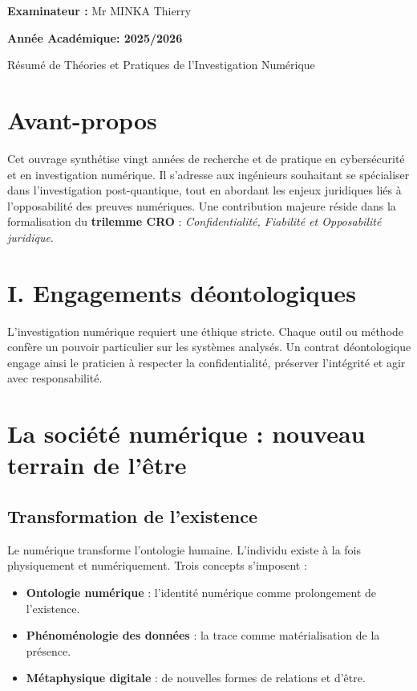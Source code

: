\documentclass[12pt,a4paper]{article}
\begin{document}
\vspace{1.5cm}

\noindent
\textbf{Examinateur :} \quad Mr MINKA Thierry 

\vfill %

\begin{center}
  \Large \textbf{Année Académique: 2025/2026}
\end{center}

\newpage %


\begin{center}
\Huge Résumé de \og Théories et Pratiques de l’Investigation Numérique \fg
\end{center}

\vspace{1cm}

\section*{Avant-propos}
Cet ouvrage synthétise vingt années de recherche et de pratique en cybersécurité et en investigation numérique. 
Il s’adresse aux ingénieurs souhaitant se spécialiser dans l’investigation post-quantique, tout en abordant 
les enjeux juridiques liés à l’opposabilité des preuves numériques. 
Une contribution majeure réside dans la formalisation du \textbf{trilemme CRO} : 
\textit{Confidentialité, Fiabilité et Opposabilité juridique}.

\section*{I. Engagements déontologiques}
L’investigation numérique requiert une éthique stricte. 
Chaque outil ou méthode confère un pouvoir particulier sur les systèmes analysés. 
Un contrat déontologique engage ainsi le praticien à respecter la confidentialité, 
préserver l’intégrité et agir avec responsabilité.

\section{La société numérique : nouveau terrain de l’être}
\subsection{Transformation de l’existence}
Le numérique transforme l’ontologie humaine. L’individu existe à la fois physiquement et 
numériquement. Trois concepts s’imposent :
\begin{itemize}
\item \textbf{Ontologie numérique} : l’identité numérique comme prolongement de l’existence.
\item \textbf{Phénoménologie des données} : la trace comme matérialisation de la présence.
\item \textbf{Métaphysique digitale} : de nouvelles formes de relations et d’être.
\end{itemize}
\end{document}
